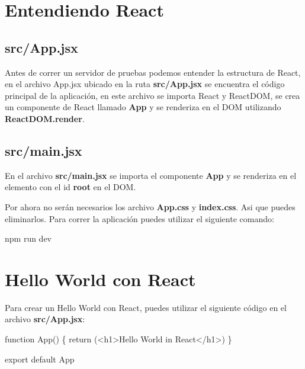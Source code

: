 \documentclass[
  a4paper,
  DIV=11,
  numbers=noendperiod,
  onepage,
  openany]{scrreprt}
\newenvironment{Shaded}{\begin{snugshade}}{\end{snugshade}}
\newcommand{\ControlFlowTok}[1]{\textcolor[rgb]{0.00,0.23,0.31}{#1}}
\newcommand{\ExtensionTok}[1]{\textcolor[rgb]{0.00,0.23,0.31}{#1}}
\newcommand{\FunctionTok}[1]{\textcolor[rgb]{0.28,0.35,0.67}{#1}}
\newcommand{\ImportTok}[1]{\textcolor[rgb]{0.00,0.46,0.62}{#1}}
\newcommand{\KeywordTok}[1]{\textcolor[rgb]{0.00,0.23,0.31}{#1}}
\newcommand{\NormalTok}[1]{\textcolor[rgb]{0.00,0.23,0.31}{#1}}
\begin{document}
\section{Entendiendo React}\label{entendiendo-react}

\subsection{src/App.jsx}\label{srcapp.jsx}

Antes de correr un servidor de pruebas podemos entender la estructura de
React, en el archivo App.jsx ubicado en la ruta \textbf{src/App.jsx} se
encuentra el código principal de la aplicación, en este archivo se
importa React y ReactDOM, se crea un componente de React llamado
\textbf{App} y se renderiza en el DOM utilizando
\textbf{ReactDOM.render}.

\subsection{src/main.jsx}\label{srcmain.jsx}

En el archivo \textbf{src/main.jsx} se importa el componente
\textbf{App} y se renderiza en el elemento con el id \textbf{root} en el
DOM.

Por ahora no serán necesarios los archivo \textbf{App.css} y
\textbf{index.css}. Asi que puedes eliminarlos. Para correr la
aplicación puedes utilizar el siguiente comando:

\begin{Shaded}
\begin{Highlighting}[]
\ExtensionTok{npm}\NormalTok{ run dev}
\end{Highlighting}
\end{Shaded}

\section{Hello World con React}\label{hello-world-con-react}

Para crear un Hello World con React, puedes utilizar el siguiente código
en el archivo \textbf{src/App.jsx}:

\begin{Shaded}
\begin{Highlighting}[]
\KeywordTok{function} \FunctionTok{App}\NormalTok{() \{}
  \ControlFlowTok{return}\NormalTok{ (}\KeywordTok{\textless{}h1\textgreater{}}\NormalTok{Hello World in React}\KeywordTok{\textless{}/h1\textgreater{}}\NormalTok{)}
\NormalTok{\}}

\ImportTok{export} \ImportTok{default}\NormalTok{ App}
\end{Highlighting}
\end{Shaded}
\end{document}
